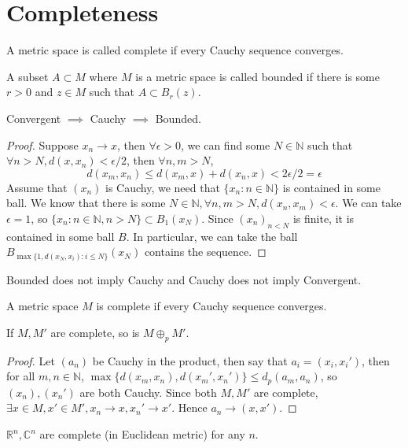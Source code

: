 \section{Completeness}
\begin{definition}
    A metric space is called complete if every Cauchy sequence converges.
\end{definition}
\begin{definition}
    A subset $A\subset M$ where $M$ is a metric space is called bounded if there is some $r>0$ and $z\in M$ such that $A\subset B_r(z)$.
\end{definition}
\begin{lemma}\label{ccb}
    Convergent $\implies$ Cauchy $\implies$ Bounded.
\end{lemma}
\begin{proof}
    Suppose $x_n\to x$, then $\forall\epsilon>0$, we can find some $N\in\mathbb N$ such that $\forall n>N,d(x,x_n)<\epsilon/2$, then $\forall n,m>N$,
    $$d(x_m,x_n)\le d(x_m,x)+d(x_n,x)<2\epsilon/2=\epsilon$$
    Assume that $(x_n)$ is Cauchy, we need that $\{x_n:n\in\mathbb N\}$ is contained in some ball.
    We know that there is some $N\in\mathbb N,\forall n,m>N, d(x_n,x_m)<\epsilon$.
    We can take $\epsilon=1$, so $\{x_n:n\in\mathbb N, n>N\}\subset B_1(x_N)$.
    Since $(x_n)_{n<N}$ is finite, it is contained in some ball $B$.
    In particular, we can take the ball $B_{\max\{1,d(x_N,x_i):i\le N\}}(x_N)$ contains the sequence.
\end{proof}
\begin{remark}
    Bounded does not imply Cauchy and Cauchy does not imply Convergent.
\end{remark}
\begin{definition}
    A metric space $M$ is complete if every Cauchy sequence converges.
\end{definition}
\begin{proposition}
    If $M,M'$ are complete, so is $M\oplus_pM'$.
\end{proposition}
\begin{proof}
    Let $(a_n)$ be Cauchy in the product, then say that $a_i=(x_i,x_i')$, then for all $m,n\in\mathbb N$, $\max\{d(x_m,x_n),d(x_m',x_n')\}\le d_p(a_m,a_n)$, so $(x_n),(x_n')$ are both Cauchy.
    Since both $M,M'$ are complete, $\exists x\in M,x'\in M', x_n\to x, x_n'\to x'$.
    Hence $a_n\to (x,x')$.
\end{proof}
\begin{example}
    $\mathbb R^n,\mathbb C^n$ are complete (in Euclidean metric) for any $n$.
\end{example}
